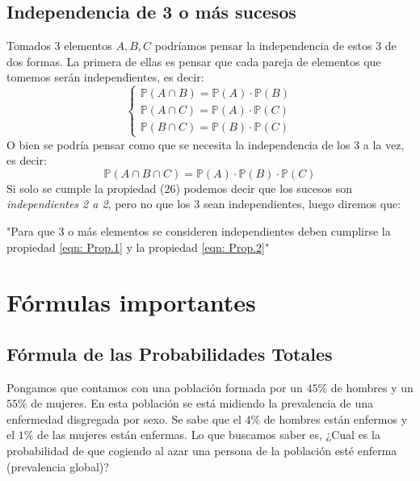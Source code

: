 \documentclass[11pt]{article}
\newcommand{\prob}{\mathbb{P}}
\theoremstyle{plain}
\begin{document}
        \subsection{Independencia de 3 o más sucesos} %
        \label{sub:independencia_de_3_o_más_sucesos}
            Tomados 3 elementos $A,B,C$ podríamos pensar la independencia de estos 3 de dos formas. La primera de ellas es pensar que cada pareja de elementos que tomemos serán independientes, es decir:
            \begin{equation}\label{eqn: Prop.1}
                \begin{cases}
                    \prob (A\cap B) = \prob (A) \cdot \prob(B)\\
                    \prob(A\cap C) = \prob(A) \cdot \prob(C)\\
                    \prob(B\cap C) = \prob(B) \cdot \prob(C)
                \end{cases}
            \end{equation}
            O bien se podría pensar como que se necesita la independencia de los 3 a la vez, es decir:
            \begin{equation}\label{eqn: Prop.2}
                \prob(A\cap B\cap C) = \prob (A) \cdot \prob(B) \cdot \prob(C)
            \end{equation}
            Si solo se cumple la propiedad (26) podemos decir que los sucesos son \textit{independientes 2 a 2}, pero no que los 3 sean independientes, luego diremos que:
            \begin{center}
                "Para que 3 o más elementos se consideren independientes deben cumplirse la propiedad \ref{eqn: Prop.1} y la propiedad \ref{eqn: Prop.2}"
            \end{center}
    \section{Fórmulas importantes} %
    \label{sec:fórmulas_importantes}
        \subsection{Fórmula de las Probabilidades Totales} %
        \label{sub:fórmula_de_las_probabilidades_totales}
            Pongamos que contamos con una población formada por un $45\%$ de hombres y un $55\%$ de mujeres. En esta población se está midiendo la prevalencia de una enfermedad disgregada por sexo. Se sabe que el $4\%$ de hombres están enfermos y el $1\%$ de las mujeres están enfermas. Lo que buscamos saber es, ¿Cual es la probabilidad de que cogiendo al azar una persona de la población esté enferma (prevalencia global)?\\
\end{document}
